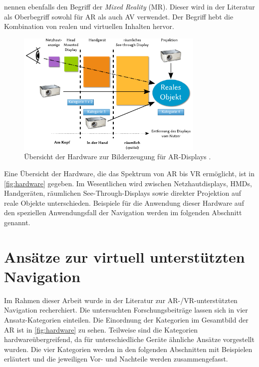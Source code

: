 \textcite{Milgram1994} nennen ebenfalls den Begriff der \emph{Mixed Reality} (MR).
Dieser wird in der Literatur als Oberbegriff sowohl für AR als auch AV verwendet.
Der Begriff hebt die Kombination von realen und virtuellen Inhalten hervor.

\begin{figure}
    \centering
    \includegraphics[width=0.8\textwidth]{figures/ar_hardware_view.pdf}
    \caption{%
        Übersicht der Hardware zur Bilderzeugung für AR-Displays
        .
    }
    \label{fig:hardware}
\end{figure}
Eine Übersicht der Hardware, die das Spektrum von AR bis VR ermöglicht, ist in \autoref{fig:hardware} gegeben.
Im Wesentlichen wird zwischen Netzhautdisplays, HMDs, Handgeräten, räumlichen See-Through-Displays sowie direkter Projektion auf reale Objekte unterschieden.
Beispiele für die Anwendung dieser Hardware auf den speziellen Anwendungsfall der Navigation werden im folgenden Abschnitt genannt.


\section{Ansätze zur virtuell unterstützten Navigation}
Im Rahmen dieser Arbeit wurde in der Literatur zur AR-/VR-unterstützten Navigation recherchiert.
Die untersuchten Forschungsbeiträge lassen sich in vier Ansatz-Kategorien einteilen.
Die Einordnung der Kategorien im Gesamtbild der AR ist in \autoref{fig:hardware} zu sehen.
Teilweise sind die Kategorien hardwareübergreifend, da für unterschiedliche Geräte ähnliche Ansätze vorgestellt wurden.
Die vier Kategorien werden in den folgenden Abschnitten mit Beispielen erläutert und die jeweiligen Vor- und Nachteile werden zusammengefasst.

